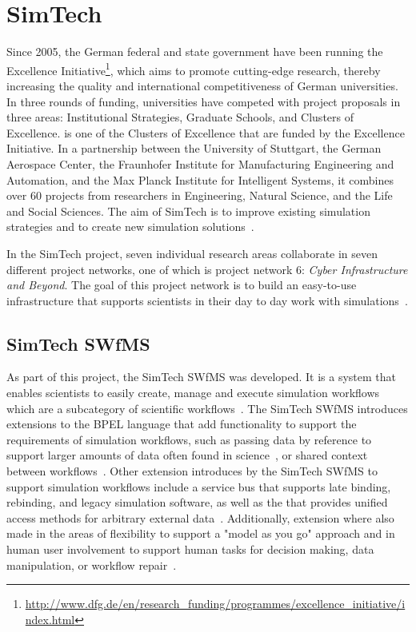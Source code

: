 \section{SimTech}
\label{fundamentals:simtech}

Since 2005, the German federal and state government have been running the Excellence Initiative\footnote{\url{http://www.dfg.de/en/research_funding/programmes/excellence_initiative/index.html}}, which aims to promote cutting-edge research, thereby increasing the quality and international competitiveness of German universities.
In three rounds of funding, universities have competed with project proposals in three areas: Institutional Strategies, Graduate Schools, and Clusters of Excellence.
 is one of the Clusters of Excellence that are funded by the Excellence Initiative.
In a partnership between the University of Stuttgart, the German Aerospace Center, the Fraunhofer Institute for Manufacturing Engineering and Automation, and the Max Planck Institute for Intelligent Systems, it combines over 60 projects from researchers in Engineering, Natural Science, and the Life and Social Sciences.
The aim of SimTech is to improve existing simulation strategies and to create new simulation solutions~\autocite{excellence:glance}.

In the SimTech project, seven individual research areas collaborate in seven different project networks, one of which is project network 6: \textit{Cyber Infrastructure and Beyond}.
The goal of this project network is to build an easy-to-use infrastructure that supports scientists in their day to day work with simulations~\autocite{simtech:projectnetwork6}.

\subsection{SimTech SWfMS}

As part of this project, the SimTech SWfMS was developed.
It is a system that enables scientists to easily create, manage and execute simulation workflows which are a subcategory of scientific workflows~\autocite{workflow:simulation:flexibility}.
The SimTech SWfMS introduces extensions to the BPEL language that add functionality to support the requirements of simulation workflows, such as passing data by reference to support larger amounts of data often found in science~\autocite[also~see][]{workflow:simulation:modelling:datareferences}, or shared context between workflows~\autocite{workflow:simulation:modelling}.
Other extension introduces by the SimTech SWfMS to support simulation workflows include a service bus that supports late binding, rebinding, and legacy simulation software, as well as the  that provides unified access methods for arbitrary external data~\autocite{workflow:simulation:runtime}.
Additionally, extension where also made in the areas of flexibility to support a "model as you go" approach and in human user involvement to support human tasks for decision making, data manipulation, or workflow repair~\autocites{workflow:simulation:flexibility}{workflow:simulation:humanusers}.


